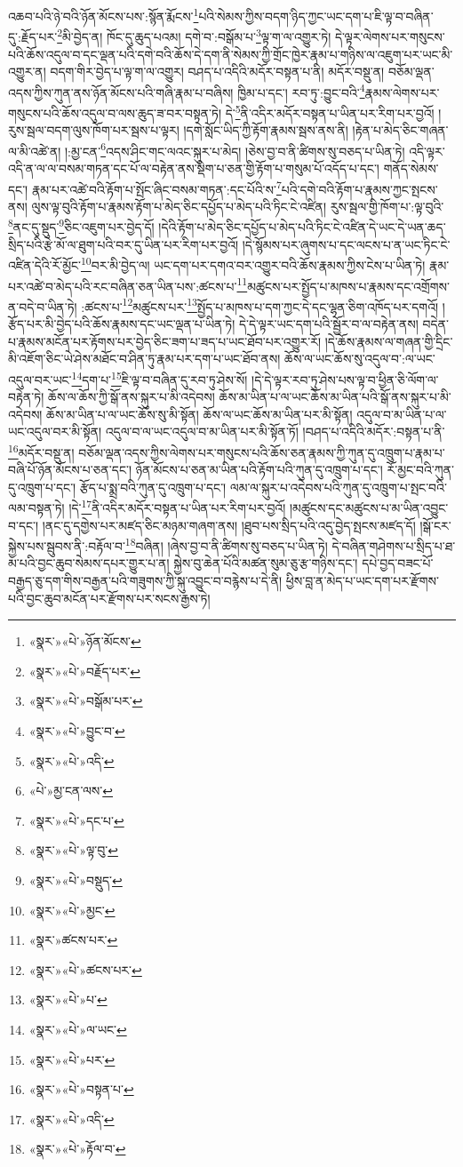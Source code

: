 འཆབ་པའི་ཉེ་བའི་ཉོན་མོངས་པས་:སྙོན་རྨོངས་\footnote{«སྣར་»«པེ་»ཉོན་མོངས་}པའི་སེམས་ཀྱིས་བདག་ཉིད་ཀྱང་ཡང་དག་པ་ཇི་ལྟ་བ་བཞིན་དུ་:རྗོད་པར་\footnote{«སྣར་»«པེ་»བརྗོད་པར་}མི་བྱེད་ན། ཁོང་དུ་ཆུད་པའམ། དགེ་བ་:བསྒོམ་པ་\footnote{«སྣར་»«པེ་»བསྒོམ་པར་}ལྟ་ག་ལ་འགྱུར་ཏེ། དེ་ལྟར་ལེགས་པར་གསུངས་པའི་ཆོས་འདུལ་བ་དང་ལྡན་པའི་དགེ་བའི་ཆོས་དེ་དག་ནི་སེམས་ཀྱི་གྲོང་ཁྱེར་རྣམ་པ་གཉིས་ལ་འཇུག་པར་ཡང་མི་འགྱུར་ན། བདག་གིར་བྱེད་པ་ལྟ་ག་ལ་འགྱུར། བཤད་པ་འདིའི་མདོར་བསྟན་པ་ནི། མདོར་བསྡུ་ན། བཅོམ་ལྡན་འདས་ཀྱིས་ཀུན་ནས་ཉོན་མོངས་པའི་གཞི་རྣམ་པ་བཞིས། ཁྱིམ་པ་དང་། རབ་ཏུ་:བྱུང་བའི་\footnote{«སྣར་»«པེ་»བྱུང་བ་}རྣམས་ལེགས་པར་གསུངས་པའི་ཆོས་འདུལ་བ་ལས་ཆུད་ཟ་བར་བསྟན་ཏེ། དེ་\footnote{«སྣར་»«པེ་»འདི་}ནི་འདིར་མདོར་བསྟན་པ་ཡིན་པར་རིག་པར་བྱའོ། །རུས་སྦལ་བདག་ལུས་ཁོག་པར་སྦས་པ་ལྟར། །དགེ་སློང་ཡིད་ཀྱི་རྟོག་རྣམས་སྦས་ནས་ནི། །རྟེན་པ་མེད་ཅིང་གཞན་ལ་མི་འཚེ་ན། །:མྱ་ངན་\footnote{«པེ་»མྱ་ངན་ལས་}འདས་ཤིང་གང་ལའང་སྐུར་པ་མེད། །ཅེས་བྱ་བ་ནི་ཚིགས་སུ་བཅད་པ་ཡིན་ཏེ། འདི་ལྟར་འདི་ན་ལ་ལ་བསམ་གཏན་དང་པོ་ལ་བརྟེན་ནས་སྡིག་པ་ཅན་གྱི་རྟོག་པ་གསུམ་པོ་འདོད་པ་དང་། གནོད་སེམས་དང་། རྣམ་པར་འཚེ་བའི་རྟོག་པ་སྤོང་ཞིང་བསམ་གཏན་:དང་པོའི་ས་\footnote{«སྣར་»«པེ་»དང་པ་}པའི་དགེ་བའི་རྟོག་པ་རྣམས་ཀྱང་སྤངས་ནས། ལུས་ལྟ་བུའི་རྟོག་པ་རྣམས་རྟོག་པ་མེད་ཅིང་དཔྱོད་པ་མེད་པའི་ཏིང་ངེ་འཛིན། རུས་སྦལ་གྱི་ཁོག་པ་:ལྟ་བུའི་\footnote{«སྣར་»«པེ་»ལྟ་བུ་}ནང་དུ་སྡུད་\footnote{«སྣར་»«པེ་»བསྡུད་}ཅིང་འཇུག་པར་བྱེད་དོ། །དེའི་རྟོག་པ་མེད་ཅིང་དཔྱོད་པ་མེད་པའི་ཏིང་ངེ་འཛིན་དེ་ཡང་དེ་ཡན་ཆད་སྲིད་པའི་རྩེ་མོ་ལ་ཐུག་པའི་བར་དུ་ཡིན་པར་རིག་པར་བྱའོ། །དེ་སྙོམས་པར་ཞུགས་པ་དང་ལངས་པ་ན་ཡང་ཏིང་ངེ་འཛིན་དེའི་རོ་མྱོང་\footnote{«སྣར་»«པེ་»མྱང་}བར་མི་བྱེད་ལ། ཡང་དག་པར་དགའ་བར་འགྱུར་བའི་ཆོས་རྣམས་ཀྱིས་ངེས་པ་ཡིན་ཏེ། རྣམ་པར་འཚེ་བ་མེད་པའི་རང་བཞིན་ཅན་ཡིན་པས་:ཚངས་པ་\footnote{«སྣར་»ཚངས་པར་}མཚུངས་པར་སྤྱོད་པ་མཁས་པ་རྣམས་དང་འགྲོགས་ན་བདེ་བ་ཡིན་ཏེ། :ཚངས་པ་\footnote{«སྣར་»«པེ་»ཚངས་པར་}མཚུངས་པར་\footnote{«སྣར་»«པེ་»པ་}སྤྱོད་པ་མཁས་པ་དག་ཀྱང་དེ་དང་ལྷན་ཅིག་འཁོད་པར་དགའོ། །རྩོད་པར་མི་བྱེད་པའི་ཆོས་རྣམས་དང་ཡང་ལྡན་པ་ཡིན་ཏེ། དེ་དེ་ལྟར་ཡང་དག་པའི་སྦྱོར་བ་ལ་བརྟེན་ནས། བདེན་པ་རྣམས་མངོན་པར་རྟོགས་པར་བྱེད་ཅིང་ཟག་པ་ཟད་པ་ཡང་ཐོབ་པར་འགྱུར་རོ། །དེ་ཆོས་རྣམས་ལ་གཞན་གྱི་དྲིང་མི་འཇོག་ཅིང་ཡེ་ཤེས་མཐོང་བ་ཤིན་ཏུ་རྣམ་པར་དག་པ་ཡང་ཐོབ་ནས། ཆོས་ལ་ཡང་ཆོས་སུ་འདུལ་བ་:ལ་ཡང་འདུལ་བར་ཡང་\footnote{«སྣར་»«པེ་»ལ་ཡང་}དག་པ་\footnote{«སྣར་»«པེ་»པར་}ཇི་ལྟ་བ་བཞིན་དུ་རབ་ཏུ་ཤེས་སོ། །དེ་དེ་ལྟར་རབ་ཏུ་ཤེས་པས་ལྟ་བ་ཕྱིན་ཅི་ལོག་ལ་བརྟེན་ཏེ། ཆོས་ལ་ཆོས་ཀྱི་སྒོ་ནས་སྐུར་པ་མི་འདེབས། ཆོས་མ་ཡིན་པ་ལ་ཡང་ཆོས་མ་ཡིན་པའི་སྒོ་ནས་སྐུར་པ་མི་འདེབས། ཆོས་མ་ཡིན་པ་ལ་ཡང་ཆོས་སུ་མི་སྟོན། ཆོས་ལ་ཡང་ཆོས་མ་ཡིན་པར་མི་སྟོན། འདུལ་བ་མ་ཡིན་པ་ལ་ཡང་འདུལ་བར་མི་སྟོན། འདུལ་བ་ལ་ཡང་འདུལ་བ་མ་ཡིན་པར་མི་སྟོན་ཏོ། །བཤད་པ་འདིའི་མདོར་:བསྟན་པ་ནི་\footnote{«སྣར་»«པེ་»བསྟན་པ་}མདོར་བསྡུ་ན། བཅོམ་ལྡན་འདས་ཀྱིས་ལེགས་པར་གསུངས་པའི་ཆོས་ཅན་རྣམས་ཀྱི་ཀུན་དུ་འཁྲུག་པ་རྣམ་པ་བཞི་པོ་ཉོན་མོངས་པ་ཅན་དང་། ཉོན་མོངས་པ་ཅན་མ་ཡིན་པའི་རྟོག་པའི་ཀུན་དུ་འཁྲུག་པ་དང་། རོ་མྱང་བའི་ཀུན་དུ་འཁྲུག་པ་དང་། རྩོད་པ་སྨྲ་བའི་ཀུན་དུ་འཁྲུག་པ་དང་། ལམ་ལ་སྐུར་པ་འདེབས་པའི་ཀུན་དུ་འཁྲུག་པ་སྤང་བའི་ལམ་བསྟན་ཏེ། །དེ་\footnote{«སྣར་»«པེ་»འདི་}ནི་འདིར་མདོར་བསྟན་པ་ཡིན་པར་རིག་པར་བྱའོ། །མཚུངས་དང་མཚུངས་པ་མ་ཡིན་འབྱུང་བ་དང་། །ནང་དུ་དགྱེས་པར་མཛད་ཅིང་མཉམ་གཞག་ནས། །ཐུབ་པས་སྲིད་པའི་འདུ་བྱེད་སྤངས་མཛད་དོ། །སྒོ་ངར་སྐྱེས་པས་སྦུབས་ནི་:བརྟོལ་བ་\footnote{«སྣར་»«པེ་»རྟོལ་བ་}བཞིན། །ཞེས་བྱ་བ་ནི་ཚིགས་སུ་བཅད་པ་ཡིན་ཏེ། དེ་བཞིན་གཤེགས་པ་སྲིད་པ་ཐ་མ་པའི་བྱང་ཆུབ་སེམས་དཔར་གྱུར་པ་ན། སྐྱེས་བུ་ཆེན་པོའི་མཚན་སུམ་ཅུ་རྩ་གཉིས་དང་། དཔེ་བྱད་བཟང་པོ་བརྒྱད་ཅུ་དག་གིས་བརྒྱན་པའི་གཟུགས་ཀྱི་སྐུ་འབྱུང་བ་བརྙེས་པ་དེ་ནི། ཕྱིས་བླ་ན་མེད་པ་ཡང་དག་པར་རྫོགས་པའི་བྱང་ཆུབ་མངོན་པར་རྫོགས་པར་སངས་རྒྱས་ཏེ། 
